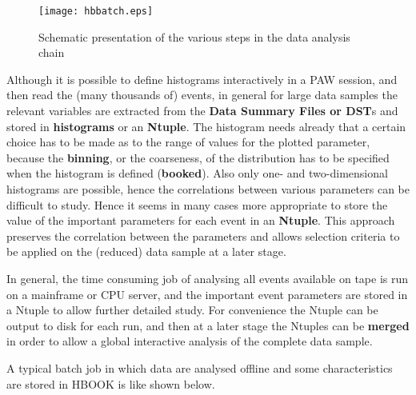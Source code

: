 \begin{figure}
\centering\texttt{[image: hbbatch.eps]}
\caption{Schematic presentation of the various steps in the data analysis chain}
\label{fig:FBATCH}
\end{figure}

Although it is possible to define histograms interactively in a PAW
session, and then read the (many thousands of) events, in general
for large data samples the relevant variables are extracted from
the {\bf Data Summary Files {\rm or} DST}s
and stored in {\bf histograms}
or an {\bf Ntuple}.
The histogram needs already that a certain choice has to be made
as to the range of values for the plotted parameter, because the
{\bf binning}, or the coarseness, of the distribution has to
be specified when the histogram is defined ({\bf booked}).
Also only one- and two-dimensional histograms are possible, hence the
correlations between various parameters can be difficult to study.
Hence it seems in many cases more appropriate to store the value of
the important parameters for each event in an {\bf Ntuple}.
This approach preserves the correlation between the parameters
and allows selection criteria to be applied on the (reduced)
data sample at a later stage.

In general, the time consuming job of
analysing all events available on tape is run on a mainframe or CPU 
server, and
the important event parameters are stored in a Ntuple
to allow further detailed study. For convenience the Ntuple
can be output to disk for each run, and then at a later stage the
Ntuples can be {\bf merged} in order to allow a global
interactive analysis of the complete data sample.

\vspace*{\baselineskip}

A typical batch job in which data are analysed offline and
some characteristics are stored in HBOOK is like shown below.

